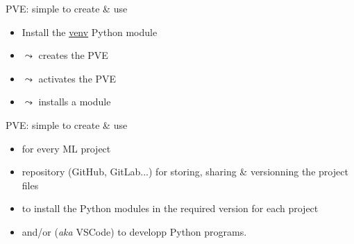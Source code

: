 \documentclass[10pt,serif,mathserif,compress,hyperref={colorlinks}]{beamer}
\begin{document}
\begin{frame}{PVE: simple to create \& use}
  
  \begin{tcolorbox}[title=with Python {\bf env}]
    
    \begin{itemize}
    \item <1-> Install the \href{https://docs.python.org/3/library/venv.html}{venv} Python module
    \item <2->  $\leadsto$ {\small creates the  PVE }
    \item <3->  $\leadsto$ {\small activates the  PVE }
    \item <4->  $\leadsto$ {\small installs a module}
    \end{itemize}
    
  \end{tcolorbox}    

\end{frame}

\begin{frame}{PVE: simple to create \& use}
  
  \begin{tcolorbox}[title=the winning recipe]
    
    \begin{itemize}
    \item <1->  for every ML project
    \item <2->  repository (GitHub, GitLab...) for storing, sharing \& versionning the project files
    \item <3->  to install the Python modules in the required version for each project
    \item <4->  and/or  ({\it aka} VSCode) to developp Python programs.
      
    \end{itemize}
    \end{tcolorbox} 
\end{frame}
\end{document}
